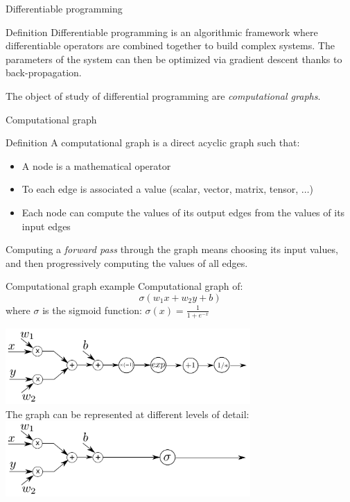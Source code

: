 \documentclass[xcolor=pdftex,dvipsnames,table,mathserif]{beamer}
\begin{document}
\begin{frame}{Differentiable programming}

\begin{block}{Definition}
  Differentiable programming is an algorithmic framework where differentiable operators are combined together to build complex systems. The parameters of the system can then be optimized via gradient descent thanks to \alert{back-propagation}.
\end{block}

The object of study of differential programming are \emph{computational graphs}.

\end{frame}
\begin{frame}{Computational graph}

\begin{block}{Definition}
  A computational graph is a direct acyclic graph such that:
  \begin{itemize}
  \item A node is a mathematical operator
  \item To each edge is associated a value (scalar, vector, matrix, tensor, $\ldots$)
  \item Each node can compute the values of its output edges from the values of its input edges
  \end{itemize}
\end{block}

Computing a \emph{forward pass} through the graph means choosing its input values, and then progressively computing the values of all edges.


\end{frame}


\begin{frame}{Computational graph example}
  Computational graph of:
  \[
  \sigma(w_1x + w_2y + b)
  \]
  where $\sigma$ is the sigmoid function: $\sigma(x) = \frac{1}{1 + e^{-x}}$

\vspace{3em}
\pause

  \centering
  \includegraphics[width=0.7\textwidth]{comp_graph2}\\
  \pause
  The graph can be represented at different levels of detail:
  \includegraphics[width=0.7\textwidth]{comp_graph}

\end{frame}
\end{document}
